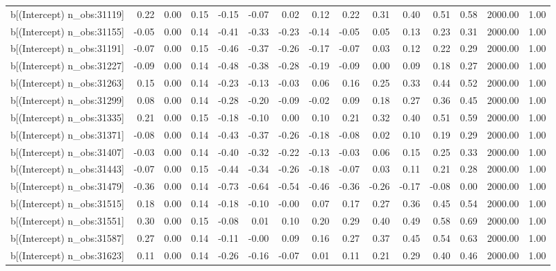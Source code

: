 \begin{table}[ht]
\begin{tabular}{rrrrrrrrrrrrrrr}
  b[(Intercept) n\_obs:31119] & 0.22 & 0.00 & 0.15 & -0.15 & -0.07 & 0.02 & 0.12 & 0.22 & 0.31 & 0.40 & 0.51 & 0.58 & 2000.00 & 1.00 \\ 
  b[(Intercept) n\_obs:31155] & -0.05 & 0.00 & 0.14 & -0.41 & -0.33 & -0.23 & -0.14 & -0.05 & 0.05 & 0.13 & 0.23 & 0.31 & 2000.00 & 1.00 \\ 
  b[(Intercept) n\_obs:31191] & -0.07 & 0.00 & 0.15 & -0.46 & -0.37 & -0.26 & -0.17 & -0.07 & 0.03 & 0.12 & 0.22 & 0.29 & 2000.00 & 1.00 \\ 
  b[(Intercept) n\_obs:31227] & -0.09 & 0.00 & 0.14 & -0.48 & -0.38 & -0.28 & -0.19 & -0.09 & 0.00 & 0.09 & 0.18 & 0.27 & 2000.00 & 1.00 \\ 
  b[(Intercept) n\_obs:31263] & 0.15 & 0.00 & 0.14 & -0.23 & -0.13 & -0.03 & 0.06 & 0.16 & 0.25 & 0.33 & 0.44 & 0.52 & 2000.00 & 1.00 \\ 
  b[(Intercept) n\_obs:31299] & 0.08 & 0.00 & 0.14 & -0.28 & -0.20 & -0.09 & -0.02 & 0.09 & 0.18 & 0.27 & 0.36 & 0.45 & 2000.00 & 1.00 \\ 
  b[(Intercept) n\_obs:31335] & 0.21 & 0.00 & 0.15 & -0.18 & -0.10 & 0.00 & 0.10 & 0.21 & 0.32 & 0.40 & 0.51 & 0.59 & 2000.00 & 1.00 \\ 
  b[(Intercept) n\_obs:31371] & -0.08 & 0.00 & 0.14 & -0.43 & -0.37 & -0.26 & -0.18 & -0.08 & 0.02 & 0.10 & 0.19 & 0.29 & 2000.00 & 1.00 \\ 
  b[(Intercept) n\_obs:31407] & -0.03 & 0.00 & 0.14 & -0.40 & -0.32 & -0.22 & -0.13 & -0.03 & 0.06 & 0.15 & 0.25 & 0.33 & 2000.00 & 1.00 \\ 
  b[(Intercept) n\_obs:31443] & -0.07 & 0.00 & 0.15 & -0.44 & -0.34 & -0.26 & -0.18 & -0.07 & 0.03 & 0.11 & 0.21 & 0.28 & 2000.00 & 1.00 \\ 
  b[(Intercept) n\_obs:31479] & -0.36 & 0.00 & 0.14 & -0.73 & -0.64 & -0.54 & -0.46 & -0.36 & -0.26 & -0.17 & -0.08 & 0.00 & 2000.00 & 1.00 \\ 
  b[(Intercept) n\_obs:31515] & 0.18 & 0.00 & 0.14 & -0.18 & -0.10 & -0.00 & 0.07 & 0.17 & 0.27 & 0.36 & 0.45 & 0.54 & 2000.00 & 1.00 \\ 
  b[(Intercept) n\_obs:31551] & 0.30 & 0.00 & 0.15 & -0.08 & 0.01 & 0.10 & 0.20 & 0.29 & 0.40 & 0.49 & 0.58 & 0.69 & 2000.00 & 1.00 \\ 
  b[(Intercept) n\_obs:31587] & 0.27 & 0.00 & 0.14 & -0.11 & -0.00 & 0.09 & 0.16 & 0.27 & 0.37 & 0.45 & 0.54 & 0.63 & 2000.00 & 1.00 \\ 
  b[(Intercept) n\_obs:31623] & 0.11 & 0.00 & 0.14 & -0.26 & -0.16 & -0.07 & 0.01 & 0.11 & 0.21 & 0.29 & 0.40 & 0.46 & 2000.00 & 1.00 \\ 

\end{tabular}
\end{table}
